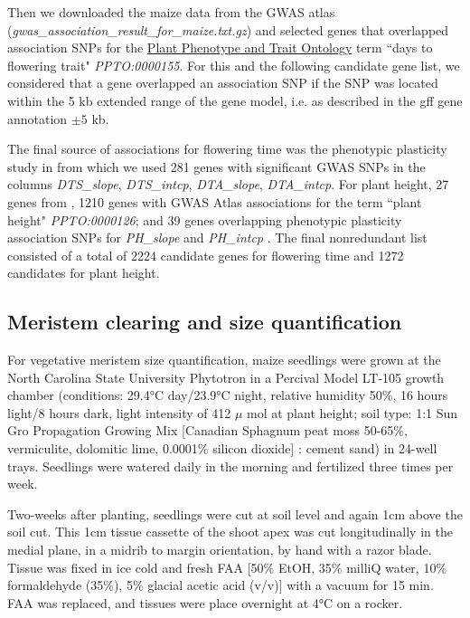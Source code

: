 \documentclass[9pt,twocolumn,twoside]{rilabRxiv}
\begin{document}
Then we downloaded the maize data from the GWAS atlas \cite{liu2023} (\textit{gwas\_association\_result\_for\_maize.txt.gz}) and selected genes that overlapped association SNPs for the \href{https://ngdc.cncb.ac.cn/gwas/browse/ontology}{Plant Phenotype and Trait Ontology} term ``days to flowering trait" \textit{PPTO:0000155}.
For this and the following candidate gene list, we considered that a gene overlapped an association SNP if the SNP was located within the 5 kb extended range of the gene model, i.e. as described in the gff gene annotation $\pm 5$ kb.

The final source of associations for flowering time was the phenotypic plasticity study in \cite{tibbs-cortes2024} from which we used 281 genes with significant GWAS SNPs in the columns \textit{DTS\_slope}, \textit{DTS\_intcp}, \textit{DTA\_slope}, \textit{DTA\_intcp}.
For plant height, 27 genes from \cite{liu2023}, 1210 genes with GWAS Atlas associations for the term ``plant height" \textit{PPTO:0000126}; and 39 genes overlapping phenotypic plasticity association SNPs for \textit{PH\_slope} and \textit{PH\_intcp} \cite{tibbs-cortes2024}.
The final nonredundant list consisted of a total of 2224 candidate genes for flowering time and 1272 candidates for plant height.

\subsection{Meristem clearing and size quantification}

For vegetative meristem size quantification, maize seedlings were grown at the North Carolina State University Phytotron in a Percival Model LT-105 growth chamber (conditions: 29.4°C day/23.9°C night, relative humidity 50\%, 16 hours light/8 hours dark, light intensity of 412 $\mu$ mol at plant height; soil type: 1:1 Sun Gro Propagation Growing Mix [Canadian Sphagnum peat moss 50-65\%, vermiculite, dolomitic lime, 0.0001\% silicon dioxide] : cement sand) in 24-well trays.
Seedlings were watered daily in the morning and fertilized three times per week.

Two-weeks after planting, seedlings were cut at soil level and again 1cm above the soil cut.
This 1cm tissue cassette of the shoot apex was cut longitudinally in the medial plane, in a midrib to margin orientation, by hand with a razor blade.
Tissue was fixed in ice cold and fresh FAA [50\% EtOH, 35\% milliQ water, 10\% formaldehyde (35\%), 5\% glacial acetic acid (v/v)] with a vacuum for 15 min.
FAA was replaced, and tissues were place overnight at 4°C on a rocker.
\end{document}
